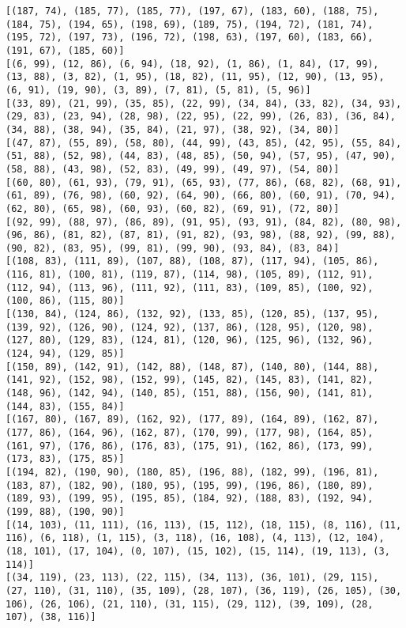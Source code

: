 \documentclass[11pt]{article}
\begin{document}
\begin{Verbatim}[commandchars=\\\{\}]
[(187, 74), (185, 77), (185, 77), (197, 67), (183, 60), (188, 75), (184, 75), (194, 65), (198, 69), (189, 75), (194, 72), (181, 74), (195, 72), (197, 73), (196, 72), (198, 63), (197, 60), (183, 66), (191, 67), (185, 60)]
[(6, 99), (12, 86), (6, 94), (18, 92), (1, 86), (1, 84), (17, 99), (13, 88), (3, 82), (1, 95), (18, 82), (11, 95), (12, 90), (13, 95), (6, 91), (19, 90), (3, 89), (7, 81), (5, 81), (5, 96)]
[(33, 89), (21, 99), (35, 85), (22, 99), (34, 84), (33, 82), (34, 93), (29, 83), (23, 94), (28, 98), (22, 95), (22, 99), (26, 83), (36, 84), (34, 88), (38, 94), (35, 84), (21, 97), (38, 92), (34, 80)]
[(47, 87), (55, 89), (58, 80), (44, 99), (43, 85), (42, 95), (55, 84), (51, 88), (52, 98), (44, 83), (48, 85), (50, 94), (57, 95), (47, 90), (58, 88), (43, 98), (52, 83), (49, 99), (49, 97), (54, 80)]
[(60, 80), (61, 93), (79, 91), (65, 93), (77, 86), (68, 82), (68, 91), (61, 89), (76, 98), (60, 92), (64, 90), (66, 80), (60, 91), (70, 94), (62, 80), (65, 98), (60, 93), (60, 82), (69, 91), (72, 80)]
[(92, 99), (88, 97), (86, 89), (91, 95), (93, 91), (84, 82), (80, 98), (96, 86), (81, 82), (87, 81), (91, 82), (93, 98), (88, 92), (99, 88), (90, 82), (83, 95), (99, 81), (99, 90), (93, 84), (83, 84)]
[(108, 83), (111, 89), (107, 88), (108, 87), (117, 94), (105, 86), (116, 81), (100, 81), (119, 87), (114, 98), (105, 89), (112, 91), (112, 94), (113, 96), (111, 92), (111, 83), (109, 85), (100, 92), (100, 86), (115, 80)]
[(130, 84), (124, 86), (132, 92), (133, 85), (120, 85), (137, 95), (139, 92), (126, 90), (124, 92), (137, 86), (128, 95), (120, 98), (127, 80), (129, 83), (124, 81), (120, 96), (125, 96), (132, 96), (124, 94), (129, 85)]
[(150, 89), (142, 91), (142, 88), (148, 87), (140, 80), (144, 88), (141, 92), (152, 98), (152, 99), (145, 82), (145, 83), (141, 82), (148, 96), (142, 94), (140, 85), (151, 88), (156, 90), (141, 81), (144, 83), (155, 84)]
[(167, 80), (167, 89), (162, 92), (177, 89), (164, 89), (162, 87), (177, 86), (164, 96), (162, 87), (170, 99), (177, 98), (164, 85), (161, 97), (176, 86), (176, 83), (175, 91), (162, 86), (173, 99), (173, 83), (175, 85)]
[(194, 82), (190, 90), (180, 85), (196, 88), (182, 99), (196, 81), (183, 87), (182, 90), (180, 95), (195, 99), (196, 86), (180, 89), (189, 93), (199, 95), (195, 85), (184, 92), (188, 83), (192, 94), (199, 88), (190, 90)]
[(14, 103), (11, 111), (16, 113), (15, 112), (18, 115), (8, 116), (11, 116), (6, 118), (1, 115), (3, 118), (16, 108), (4, 113), (12, 104), (18, 101), (17, 104), (0, 107), (15, 102), (15, 114), (19, 113), (3, 114)]
[(34, 119), (23, 113), (22, 115), (34, 113), (36, 101), (29, 115), (27, 110), (31, 110), (35, 109), (28, 107), (36, 119), (26, 105), (30, 106), (26, 106), (21, 110), (31, 115), (29, 112), (39, 109), (28, 107), (38, 116)]

\end{Verbatim}
\end{document}
